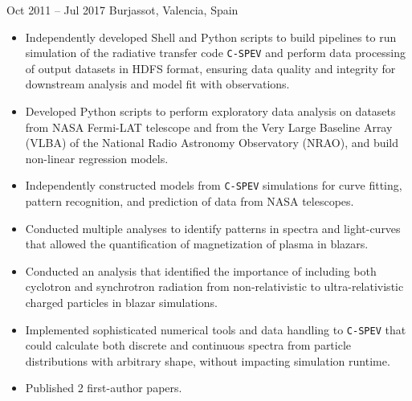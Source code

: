 {Oct 2011 -- Jul 2017}%
{Burjassot, Valencia, Spain}%
{%
\begin{itemize}
    \item Independently developed Shell and Python scripts to build pipelines to run simulation of the radiative transfer code \texttt{C-SPEV} and perform data processing of output datasets in HDFS format, ensuring data quality and integrity for downstream analysis and model fit with observations.
    \item Developed Python scripts to perform exploratory data analysis on datasets from NASA Fermi-LAT telescope and from the Very Large Baseline Array (VLBA) of the National Radio Astronomy Observatory (NRAO), and build non-linear regression models.
    \item Independently constructed models from \texttt{C-SPEV} simulations for curve fitting, pattern recognition, and prediction of data from NASA telescopes.
    \item Conducted multiple analyses to identify patterns in spectra and light-curves that allowed the quantification of magnetization of plasma in blazars.
    \item Conducted an analysis that identified the importance of including both cyclotron and synchrotron radiation from non-relativistic to ultra-relativistic charged particles in blazar simulations.
    \item Implemented sophisticated numerical tools and data handling to \texttt{C-SPEV} that could calculate both discrete and continuous spectra from particle distributions with arbitrary shape, without impacting simulation runtime.
    \item Published 2 first-author papers.
\end{itemize}
}
